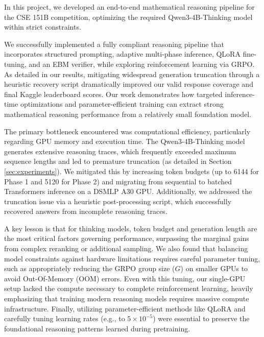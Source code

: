 \documentclass{article}
\begin{document}
In this project, we developed an end-to-end mathematical reasoning pipeline for the CSE 151B competition, optimizing the required Qwen3-4B-Thinking model within strict constraints.

We successfully implemented a fully compliant reasoning pipeline that incorporates structured prompting, adaptive multi-phase inference, QLoRA fine-tuning, and an EBM verifier, while exploring reinforcement learning via GRPO. As detailed in our results, mitigating widespread generation truncation through a heuristic recovery script dramatically improved our valid response coverage and final Kaggle leaderboard scores. Our work demonstrates how targeted inference-time optimizations and parameter-efficient training can extract strong mathematical reasoning performance from a relatively small foundation model.

The primary bottleneck encountered was computational efficiency, particularly regarding GPU memory and execution time. The Qwen3-4B-Thinking model generates extensive reasoning traces, which frequently exceeded maximum sequence lengths and led to premature truncation (as detailed in Section \ref{sec:experiments}). We mitigated this by increasing token budgets (up to 6144 for Phase 1 and 5120 for Phase 2) and migrating from sequential to batched Transformers inference on a DSMLP A30 GPU. Additionally, we addressed the truncation issue via a heuristic post-processing script, which successfully recovered answers from incomplete reasoning traces.

A key lesson is that for thinking models, token budget and generation length are the most critical factors governing performance, surpassing the marginal gains from complex reranking or additional sampling. We also found that balancing model constraints against hardware limitations requires careful parameter tuning, such as appropriately reducing the GRPO group size ($G$) on smaller GPUs to avoid Out-Of-Memory (OOM) errors. Even with this tuning, our single-GPU setup lacked the compute necessary to complete reinforcement learning, heavily emphasizing that training modern reasoning models requires massive compute infrastructure. Finally, utilizing parameter-efficient methods like QLoRA and carefully tuning learning rates (e.g., to $5 \times 10^{-5}$) were essential to preserve the foundational reasoning patterns learned during pretraining.
\end{document}
